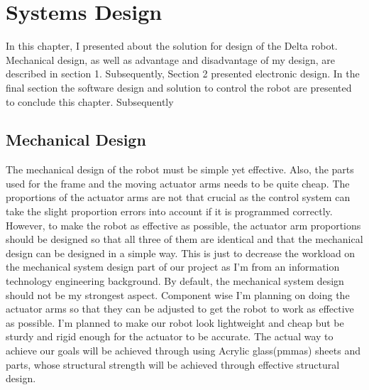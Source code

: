 \chapter{Systems Design}

In this chapter, I presented about the solution for design of the Delta robot. 
Mechanical design, as well as advantage and disadvantage of my design, are described in section 1. Subsequently, Section 2 presented electronic design. In the final section the software design and solution to control the robot are presented to conclude this chapter.
Subsequently

\section{Mechanical Design}

The mechanical design of the robot must be simple yet effective. Also, the parts used for the frame and the moving actuator arms needs to be quite cheap. The proportions of the actuator arms are not that crucial as the control system can take the slight proportion errors into account if it is programmed correctly. However, to make the robot as effective as possible, the actuator arm proportions should be designed so that all three of them are identical and that the mechanical design can be designed in a simple way. This is just to decrease the workload on the mechanical system design part of our project as I'm from an information technology engineering background. By default, the mechanical system design should not be my strongest aspect. Component wise I'm planning on doing the actuator arms so that they can be adjusted to get the robot to work as effective as possible. I'm planned to make our robot look lightweight and cheap but be sturdy and rigid enough for the actuator to be  accurate. The actual way to achieve our goals will be achieved through using Acrylic glass(\glspl{pmma}) sheets and parts, whose structural strength will be achieved through effective structural design.

